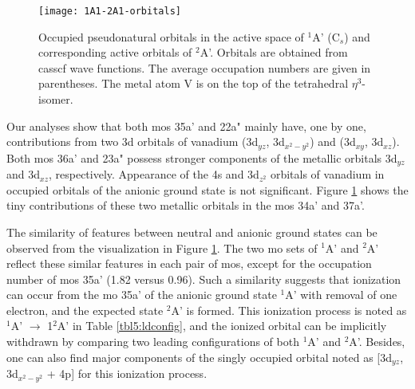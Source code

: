 \begin{refsection}
\begin{figure}[htb!]
    \centering
    \texttt{[image: 1A1-2A1-orbitals]}
    \caption{Occupied pseudonatural orbitals in the active space of $^1$A' (C$_s$) and corresponding active orbitals of $^2$A'. Orbitals are obtained from \acrshort{casscf} wave functions. The average occupation numbers are given in parentheses. The metal atom V is on the top of the tetrahedral $\eta^3$- isomer.} 
    \label{fig5:VGe3-orbs}
\end{figure} 


Our analyses show that both \acrshort{mo}s 35a' and 22a" mainly have, one by one, contributions from two 3d orbitals of vanadium (3d$_{yz}$, 3d$_{x^2-y^2}$) and (3d$_{xy}$, 3d$_{xz}$). Both \acrshort{mo}s 36a' and 23a" possess stronger components of the metallic orbitals 3d$_{yz}$ and 3d$_{xz}$, respectively. Appearance of the 4s and 3d$_{z^2}$ orbitals of vanadium in occupied orbitals of the anionic ground state is not significant. Figure \ref{fig5:VGe3-orbs} shows the tiny contributions of these two metallic orbitals in the \acrshort{mo}s 34a' and 37a'.


The similarity of features between neutral and anionic ground states can be observed from the visualization in Figure \ref{fig5:VGe3-orbs}. The two \acrshort{mo} sets of $^1$A' and $^2$A' reflect these similar features in each pair of \acrshort{mo}s, except for the occupation number of \acrshort{mo}s 35a' (1.82 versus 0.96). Such a similarity suggests that ionization can occur from the \acrshort{mo} 35a' of the anionic ground state $^1$A' with removal of one electron, and the expected state $^2$A' is formed. This ionization process is noted as $^1$A' $\longrightarrow$ 1$^2$A' in Table \ref{tbl5:ldconfig}, and the ionized orbital can be implicitly withdrawn by comparing two leading configurations of both $^1$A' and $^2$A'. Besides, one can also find major components of the singly occupied orbital noted as [3d$_{yz}$, 3d$_{x^2-y^2}$ + 4p] for this ionization process.



\end{refsection}
